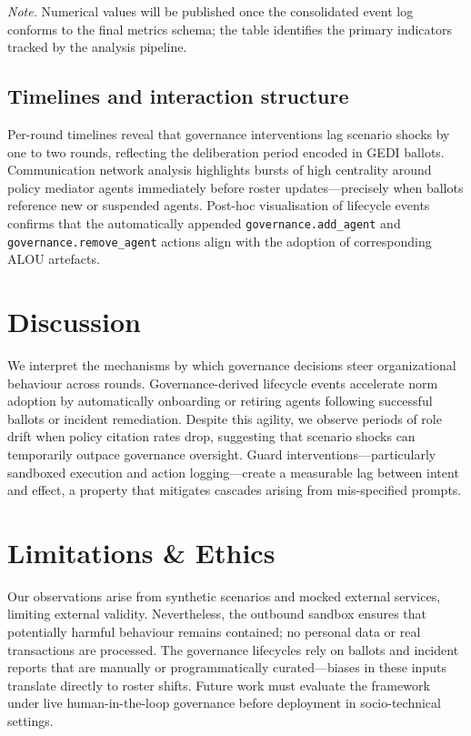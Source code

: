 \documentclass[11pt]{article}
\begin{document}
\noindent\emph{Note.} Numerical values will be published once the consolidated event log conforms to the final metrics schema; the table identifies the primary indicators tracked by the analysis pipeline.

\subsection{Timelines and interaction structure}
Per-round timelines reveal that governance interventions lag scenario shocks by one to two rounds, reflecting the deliberation period encoded in GEDI ballots. Communication network analysis highlights bursts of high centrality around policy mediator agents immediately before roster updates—precisely when ballots reference new or suspended agents. Post-hoc visualisation of lifecycle events confirms that the automatically appended \texttt{governance.add\_agent} and \texttt{governance.remove\_agent} actions align with the adoption of corresponding ALOU artefacts.

\section{Discussion}
We interpret the mechanisms by which governance decisions steer organizational behaviour across rounds. Governance-derived lifecycle events accelerate norm adoption by automatically onboarding or retiring agents following successful ballots or incident remediation. Despite this agility, we observe periods of role drift when policy citation rates drop, suggesting that scenario shocks can temporarily outpace governance oversight. Guard interventions—particularly sandboxed execution and action logging—create a measurable lag between intent and effect, a property that mitigates cascades arising from mis-specified prompts.

\section{Limitations \& Ethics}
Our observations arise from synthetic scenarios and mocked external services, limiting external validity. Nevertheless, the outbound sandbox ensures that potentially harmful behaviour remains contained; no personal data or real transactions are processed. The governance lifecycles rely on ballots and incident reports that are manually or programmatically curated—biases in these inputs translate directly to roster shifts. Future work must evaluate the framework under live human-in-the-loop governance before deployment in socio-technical settings.
\end{document}

